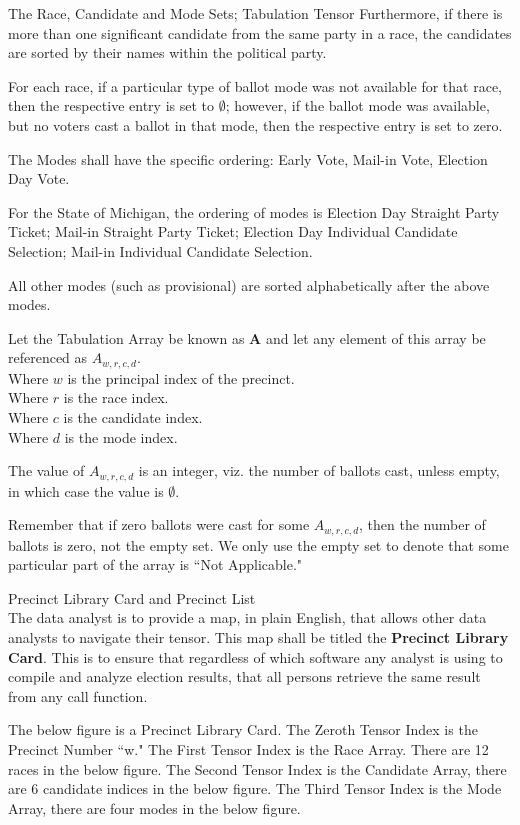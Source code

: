 \begin{definition}{The Race, Candidate and Mode Sets; Tabulation Tensor}
Furthermore, if there is more than one significant candidate from the same party in a race, the candidates are sorted by their names within the political party.

For each race, if a particular type of ballot mode was not available for that race, then the respective entry is set to $\emptyset$; however, if the ballot mode was available, but no voters cast a ballot in that mode, then the respective entry is set to zero.

The Modes shall have the specific ordering: Early Vote, Mail-in Vote, Election Day Vote. 

For the State of Michigan, the ordering of modes is Election Day Straight Party Ticket; Mail-in Straight Party Ticket; Election Day Individual Candidate Selection; Mail-in Individual Candidate Selection.

All other modes (such as provisional) are sorted alphabetically after the above modes.

Let the Tabulation Array be known as \textbf{A} and let any element of this array be referenced as $A_{w,r,c,d}$.\\
Where $w$ is the principal index of the precinct.\\
Where $r$ is the race index. \\
Where $c$ is the candidate index.\\
Where $d$ is the mode index.

The value of $A_{w,r,c,d}$ is an integer, viz. the number of ballots cast, unless empty, in which case the value is $\emptyset$.

Remember that if zero ballots were cast for some $A_{w,r,c,d}$, then the number of ballots is zero, not the empty set. We only use the empty set to denote that some particular part of the array is ``Not Applicable."
\end{definition}
\newpage
\begin{definition}{Precinct Library Card and Precinct List}\\
The data analyst is to provide a map, in plain English, that allows other data analysts to navigate their tensor. This map shall be titled the \textbf{Precinct Library Card}. This is to ensure that regardless of which software any analyst is using to compile and analyze election results, that all persons retrieve the same result from any call function.
\end{definition}
The below figure is a Precinct Library Card. The Zeroth Tensor Index is the Precinct Number ``w." The First Tensor Index is the Race Array. There are 12 races in the below figure. The Second Tensor Index is the Candidate Array, there are 6 candidate indices in the below figure. The Third Tensor Index is the Mode Array, there are four modes in the below figure.

